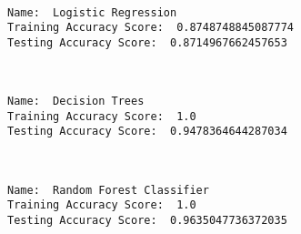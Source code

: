 \documentclass[11pt]{article}
\newcommand{\prompt}[4]{
        {\ttfamily\llap{{\color{#2}[#3]:\hspace{3pt}#4}}\vspace{-\baselineskip}}
    }
\begin{document}
            
\prompt{Out}{outcolor}{67}{}
    
    \begin{center}
    \end{center}
    { \hspace*{\fill} \\}
    

    \begin{Verbatim}[commandchars=\\\{\}]
Name:  Logistic Regression
Training Accuracy Score:  0.8748748845087774
Testing Accuracy Score:  0.8714967662457653

    \end{Verbatim}
 
            
\prompt{Out}{outcolor}{67}{}
    
    \begin{center}
    \end{center}
    { \hspace*{\fill} \\}
    

    \begin{Verbatim}[commandchars=\\\{\}]
Name:  Decision Trees
Training Accuracy Score:  1.0
Testing Accuracy Score:  0.9478364644287034

    \end{Verbatim}
 
            
\prompt{Out}{outcolor}{67}{}
    
    \begin{center}
    \end{center}
    { \hspace*{\fill} \\}
    

    \begin{Verbatim}[commandchars=\\\{\}]
Name:  Random Forest Classifier
Training Accuracy Score:  1.0
Testing Accuracy Score:  0.9635047736372035

    \end{Verbatim}
 
            
\prompt{Out}{outcolor}{67}{}
    
\end{document}
